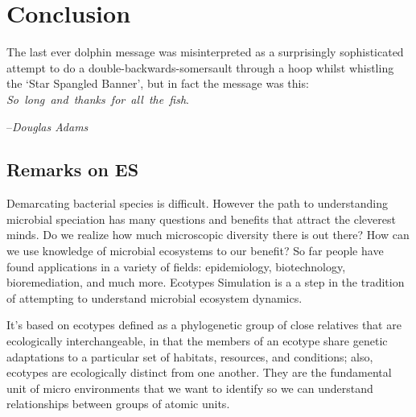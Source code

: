 \gobbletocpage
\chapter{Conclusion}
\restoretocpage

\begin{shadequote}
The last ever dolphin message was misinterpreted as a surprisingly sophisticated attempt to do a double-backwards-somersault through a hoop whilst whistling the `Star Spangled Banner', but in fact the message was this: \mbox{\emph{So long and thanks for all the fish}}. \par--\emph{Douglas Adams}
\end{shadequote}


\section{Remarks on ES}
Demarcating bacterial species is difficult.
However the path to understanding microbial speciation has many questions and benefits that attract the cleverest minds.
Do we realize how much microscopic diversity there is out there?
How can we use knowledge of microbial ecosystems to our benefit?
So far people have found applications in a variety of fields: epidemiology, biotechnology, bioremediation, and much more.
Ecotypes Simulation is a a step in the tradition of attempting to understand microbial ecosystem dynamics.

It's based on ecotypes defined as a phylogenetic group of close relatives that are ecologically interchangeable, in that the members of an ecotype share genetic adaptations to a particular set of habitats, resources, and conditions; also, ecotypes are ecologically distinct from one another.
They are the fundamental unit of micro environments that we want to identify so we can understand relationships between groups of atomic units.


